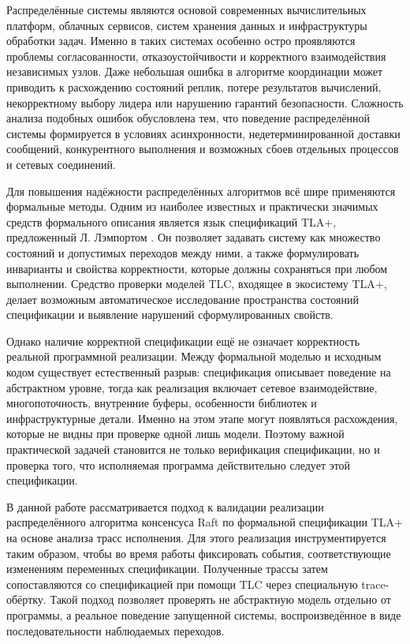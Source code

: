 \introduction %

Распределённые системы являются основой современных вычислительных платформ,
облачных сервисов, систем хранения данных и инфраструктуры обработки задач.
Именно в таких системах особенно остро проявляются проблемы согласованности,
отказоустойчивости и корректного взаимодействия независимых узлов. Даже
небольшая ошибка в алгоритме координации может приводить к расхождению
состояний реплик, потере результатов вычислений, некорректному выбору лидера
или нарушению гарантий безопасности. Сложность анализа подобных ошибок
обусловлена тем, что поведение распределённой системы формируется в условиях
асинхронности, недетерминированной доставки сообщений, конкурентного
выполнения и возможных сбоев отдельных процессов и сетевых соединений.

Для повышения надёжности распределённых алгоритмов всё шире применяются
формальные методы. Одним из наиболее известных и практически значимых средств
формального описания является язык спецификаций TLA+,
предложенный Л. Лэмпортом \cite{lamport2002specifying}. Он позволяет задавать
систему как множество состояний и допустимых переходов между ними, а также
формулировать инварианты и свойства корректности, которые должны сохраняться
при любом выполнении. Средство проверки моделей TLC, входящее в экосистему
TLA+, делает возможным автоматическое исследование пространства состояний
спецификации и выявление нарушений сформулированных свойств.

Однако наличие корректной спецификации ещё не означает корректность реальной
программной реализации. Между формальной моделью и исходным кодом существует
естественный разрыв: спецификация описывает поведение на абстрактном уровне,
тогда как реализация включает сетевое взаимодействие, многопоточность,
внутренние буферы, особенности библиотек и инфраструктурные детали. Именно на
этом этапе могут появляться расхождения, которые не видны при проверке одной
лишь модели. Поэтому важной практической задачей становится не только
верификация спецификации, но и проверка того, что исполняемая программа
действительно следует этой спецификации.

В данной работе рассматривается подход к валидации реализации распределённого
алгоритма консенсуса Raft по формальной спецификации TLA+ на основе анализа
трасс исполнения. Для этого реализация инструментируется таким образом, чтобы
во время работы фиксировать события, соответствующие изменениям переменных
спецификации. Полученные трассы затем сопоставляются со спецификацией при
помощи TLC через специальную trace-обёртку. Такой подход позволяет проверять не
абстрактную модель отдельно от программы, а реальное поведение запущенной
системы, воспроизведённое в виде последовательности наблюдаемых переходов.

